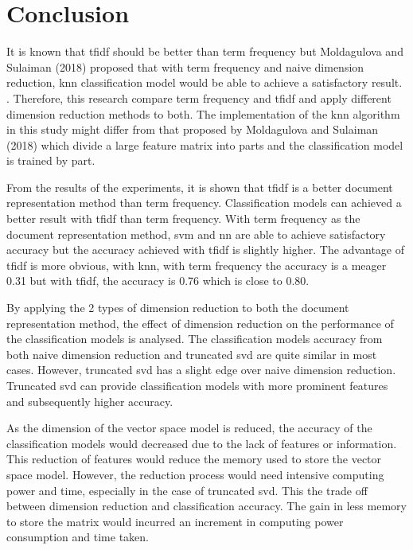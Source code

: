 \chapter{Conclusion}
It is known that \ac{tfidf} should be better than term frequency but Moldagulova and Sulaiman (2018) proposed that with term frequency and naive dimension reduction, \ac{knn} classification model would be able to achieve a satisfactory result. \cite{knnVectorSpaceReduction}. Therefore, this research compare term frequency and \ac{tfidf} and apply different dimension reduction methods to both. The implementation of the \ac{knn} algorithm in this study might differ from that proposed by Moldagulova and Sulaiman (2018) which divide a large feature matrix into parts and the classification model is trained by part.

From the results of the experiments, it is shown that \ac{tfidf} is a better document representation method than term frequency. Classification models can achieved a better result with \ac{tfidf} than term frequency. With term frequency as the document representation method, \ac{svm} and \ac{nn} are able to achieve satisfactory accuracy but the accuracy achieved with \ac{tfidf} is slightly higher. The advantage of \ac{tfidf} is more obvious, with \ac{knn}, with term frequency the accuracy is a meager 0.31 but with \ac{tfidf}, the accuracy is 0.76 which is close to 0.80.

By applying the 2 types of dimension reduction to both the document representation method, the effect of dimension reduction on the performance of the classification models is analysed. The classification models accuracy from both naive dimension reduction and truncated \ac{svd} are quite similar in most cases. However, truncated \ac{svd} has a slight edge over naive dimension reduction. Truncated \ac{svd} can provide classification models with more prominent features and subsequently higher accuracy.

As the dimension of the vector space model is reduced, the accuracy of the classification models would decreased due to the lack of features or information. This reduction of features would reduce the memory used to store the vector space model. However, the reduction process would need intensive computing power and time, especially in the case of truncated \ac{svd}. This the trade off between dimension reduction and classification accuracy. The gain in less memory to store the matrix would incurred an increment in computing power consumption and time taken.

